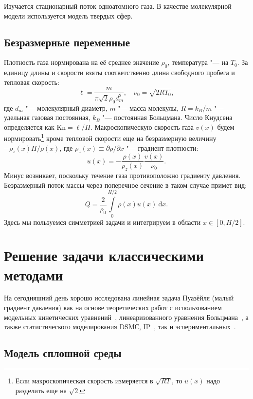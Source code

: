 \documentclass[a4paper,12pt]{article}
\newcommand{\dd}{\:\mathrm{d}}
\newcommand{\Kn}{\mathrm{Kn}}
\begin{document}
Изучается стационарный поток одноатомного газа. В качестве молекулярной модели используется модель твердых сфер.

\subsection{Безразмерные переменные}

Плотность газа нормирована на её среднее значение \(\rho_0\), температура "--- на \(T_0\).
За единицу длины и скорости взяты соответственно длина свободного пробега и тепловая скорость:
\[ \ell = \frac{m}{\pi\sqrt2 \rho_0 d_m^2}, \quad \nu_0 = \sqrt{2RT_0}, \]
где \(d_m\) "--- молекулярный диаметр, \(m\) "--- масса молекулы, \(R = k_B/m\) "--- удельная газовая постоянная, \(k_B\) "--- постоянная Больцмана.
Число Кнудсена определяется как \(\Kn = \ell/H\).
Макроскопическую скорость газа \(v(x)\) будем нормировать\footnote 
{Если макроскопическая скорость измеряется в \(\sqrt{RT}\), то \(u(x)\) надо разделить еще на \(\sqrt{2}\)}
кроме тепловой скорости еще на безразмерную величину \(-\rho_z(x)H/\rho(x)\),
где \(\rho_z(x) \equiv \partial\rho/\partial x\) "--- градиент плотности:
\[ u(x) = -\frac{\rho(x)}{\rho_z(x)}\frac{v(x)}{\nu_0}. \]
Минус возникает, поскольку течение газа противоположно градиенту давления.
Безразмерный поток массы через поперечное сечение в таком случае примет вид:
\[ Q = \frac2{\rho_0 }\int\limits_{0}^{H/2}\rho(x)u(x) \dd x. \]
Здесь мы пользуемся симметрией задачи и интегрируем в области \(x\in[0,H/2]\).

\section{Решение задачи классическими методами}

На сегодняшний день хорошо исследована линейная задача Пуазёйля (малый градиент давления) как на основе
теоретических работ с использованием модельных кинетических уравнений~\cite{Cercignani1963, Cercignani1966, Sharipov1999},
линеаризованного уравнения Больцмана~\cite{Ohwada1989b}, а также статистического моделирования DSMС, IP~\cite{Fan2001},
так и эспериментальных~\cite{Porodnov1974, Ewart2007}.

\subsection{Модель сплошной среды}
\end{document}
